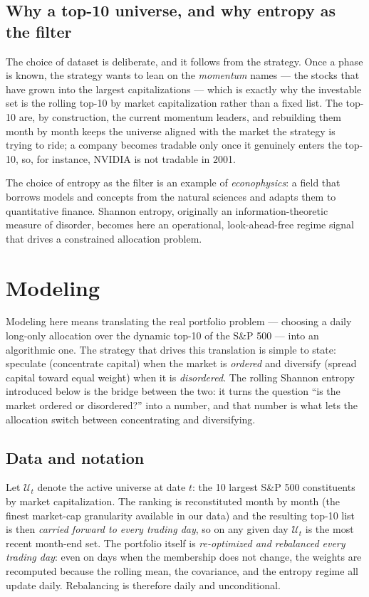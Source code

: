 \documentclass[a4paper,12pt]{article}
\begin{document}
\subsection{Why a top-10 universe, and why entropy as the filter}

The choice of dataset is deliberate, and it follows from the strategy. Once a phase is known, the strategy wants to lean on the \emph{momentum} names --- the stocks that have grown into the largest capitalizations --- which is exactly why the investable set is the rolling top-10 by market capitalization rather than a fixed list. The top-10 are, by construction, the current momentum leaders, and rebuilding them month by month keeps the universe aligned with the market the strategy is trying to ride; a company becomes tradable only once it genuinely enters the top-10, so, for instance, NVIDIA is not tradable in 2001.

The choice of entropy as the filter is an example of \emph{econophysics}: a field that borrows models and concepts from the natural sciences and adapts them to quantitative finance. Shannon entropy, originally an information-theoretic measure of disorder, becomes here an operational, look-ahead-free regime signal that drives a constrained allocation problem.

\section{Modeling}

Modeling here means translating the real portfolio problem --- choosing a daily long-only allocation over the dynamic top-10 of the S\&P 500 --- into an algorithmic one. The strategy that drives this translation is simple to state: speculate (concentrate capital) when the market is \emph{ordered} and diversify (spread capital toward equal weight) when it is \emph{disordered}. The rolling Shannon entropy introduced below is the bridge between the two: it turns the question ``is the market ordered or disordered?'' into a number, and that number is what lets the allocation switch between concentrating and diversifying.

\subsection{Data and notation}

Let $\mathcal{U}_t$ denote the active universe at date $t$: the 10 largest S\&P 500 constituents by market capitalization. The ranking is reconstituted month by month (the finest market-cap granularity available in our data) and the resulting top-10 list is then \emph{carried forward to every trading day}, so on any given day $\mathcal{U}_t$ is the most recent month-end set. The portfolio itself is \emph{re-optimized and rebalanced every trading day}: even on days when the membership does not change, the weights are recomputed because the rolling mean, the covariance, and the entropy regime all update daily. Rebalancing is therefore daily and unconditional.
\end{document}
